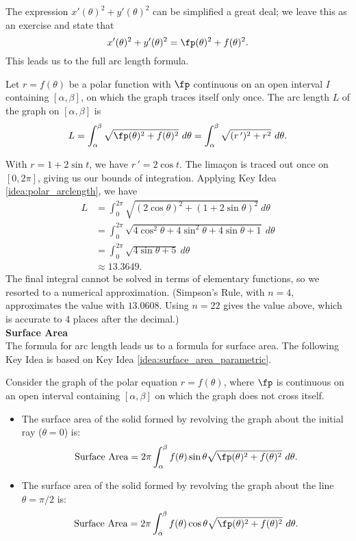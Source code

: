 The expression $x'(\theta)^2+y'(\theta)^2$ can be simplified a great deal; we leave this as an exercise and state that $$x'(\theta)^2+y'(\theta)^2 = \fp(\theta)^2+f(\theta)^2.$$ This leads us to the full arc length formula.

{Let  $r=f(\theta)$ be a polar function with $\fp$ continuous on an open interval $I$ containing $[\alpha,\beta]$, on which the graph traces itself only once. The arc length $L$ of the graph on $[\alpha,\beta]$ is
$$L = \int_\alpha^\beta \sqrt{\fp(\theta)^2+f(\theta)^2}\ d\theta = \int_\alpha^\beta\sqrt{(r\,')^2+ r^2}\ d\theta.$$
}

{With $r=1+2\sin t$, we have $r\,' = 2\cos t$. The lima\c con is traced out once on $[0,2\pi]$, giving us our bounds of integration. Applying Key Idea \ref{idea:polar_arclength}, we have
\begin{align*}
L 	&= \int_0^{2\pi} \sqrt{(2\cos\theta)^2+(1+2\sin\theta)^2}\ d\theta \\
		&=	\int_0^{2\pi} \sqrt{4\cos^2\theta+4\sin^2\theta +4\sin\theta+1}\ d\theta\\
		&=	\int_0^{2\pi} \sqrt{4\sin\theta+5}\ d\theta\\
		&\approx 13.3649.
\end{align*}
The final integral cannot be solved in terms of elementary functions, so we resorted to a numerical approximation. (Simpson's Rule, with $n=4$, approximates the value with $13.0608$. Using $n=22$ gives the value above, which is accurate to 4 places after the decimal.) 
}\\

\noindent\textbf{\large Surface Area}\\

The formula for arc length leads us to a formula for surface area. The following Key Idea is based on Key Idea \ref{idea:surface_area_parametric}.

{Consider the graph of the polar equation $r=f(\theta)$, where $\fp$ is continuous on an open interval containing $[\alpha,\beta]$ on which the graph does not cross itself.
	\begin{itemize}
		\item The surface area of the solid formed by revolving the graph about the initial ray ($\theta=0$) is:
		$$\text{Surface Area} = 2\pi\int_\alpha^\beta f(\theta)\sin\theta\sqrt{\fp(\theta)^2+f(\theta)^2}\ d\theta.$$
		\item The surface area of the solid formed by revolving the graph about the line $\theta=\pi/2$ is:
		$$\text{Surface Area} = 2\pi\int_\alpha^\beta f(\theta)\cos\theta\sqrt{\fp(\theta)^2+f(\theta)^2}\ d\theta.$$
	\end{itemize}
}

